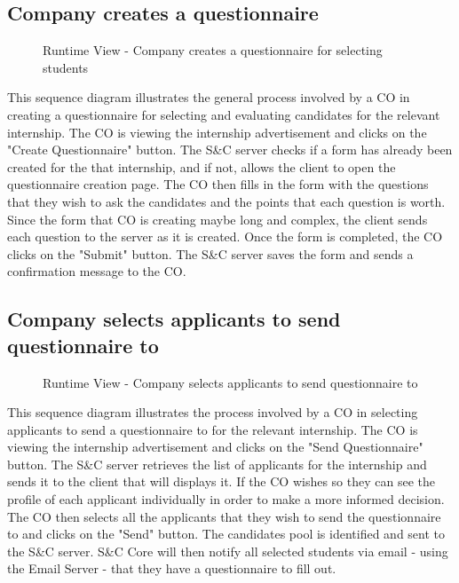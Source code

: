 \subsection{Company creates a questionnaire}
\label{sub:company-creates-a-questionnaire}%

\begin{figure}[H]
      \centering
      \caption{Runtime View - Company creates a questionnaire for selecting students}
      \label{fig:rv-co-creates-questionnaire}
\end{figure}

\par This sequence diagram illustrates the general process involved by a CO in creating a questionnaire for selecting 
and evaluating candidates for the relevant internship. The CO is viewing the internship advertisement and clicks on the 
"Create Questionnaire" button. The S\&C server checks if a form has already been created for the that internship, and 
if not, allows the client to open the questionnaire creation page. The CO then fills in the form with the questions 
that they wish to ask the candidates and the points that each question is worth. Since the form that CO is creating 
maybe long and complex, the client sends each question to the server as it is created. Once the form is completed, the 
CO clicks on the "Submit" button. The S\&C server saves the form and sends a confirmation message to the CO.

\subsection{Company selects applicants to send questionnaire to}
\label{sub:company-selects-applicants-to-send-questionnaire-to}%

\begin{figure}[H]
      \centering
      \caption{Runtime View - Company selects applicants to send questionnaire to}
      \label{fig:rv-co-selects-applicants}
\end{figure}

\par This sequence diagram illustrates the process involved by a CO in selecting applicants to send a questionnaire to 
for the relevant internship. The CO is viewing the internship advertisement and clicks on the "Send Questionnaire" 
button. The S\&C server retrieves the list of applicants for the internship and sends it to the client that will 
displays it. If the CO wishes so they can see the profile of each applicant individually in order to make a more 
informed decision. The CO then selects all the applicants that they wish to send the questionnaire to and clicks on 
the "Send" button. The candidates pool is identified and sent to the S\&C server. S\&C Core will then notify all 
selected students via email - using the Email Server - that they have a questionnaire to fill out.

